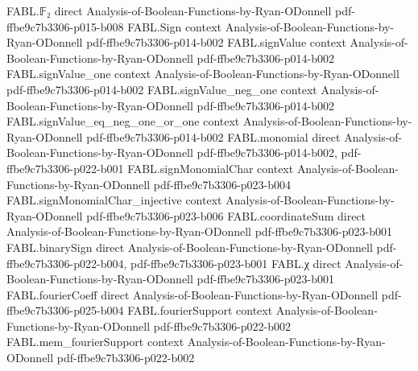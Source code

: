 \begin{theorem}
\label{FABL.measure_finiteFamilyCoefficient_bad_le}
\leanok
{}
\proofstep
  {FABL.𝔽₂}
  {direct}
  {Analysis-of-Boolean-Functions-by-Ryan-ODonnell}
  {pdf-ffbe9c7b3306-p015-b008}
\proofstep
  {FABL.Sign}
  {context}
  {Analysis-of-Boolean-Functions-by-Ryan-ODonnell}
  {pdf-ffbe9c7b3306-p014-b002}
\proofstep
  {FABL.signValue}
  {context}
  {Analysis-of-Boolean-Functions-by-Ryan-ODonnell}
  {pdf-ffbe9c7b3306-p014-b002}
\proofstep
  {FABL.signValue_one}
  {context}
  {Analysis-of-Boolean-Functions-by-Ryan-ODonnell}
  {pdf-ffbe9c7b3306-p014-b002}
\proofstep
  {FABL.signValue_neg_one}
  {context}
  {Analysis-of-Boolean-Functions-by-Ryan-ODonnell}
  {pdf-ffbe9c7b3306-p014-b002}
\proofstep
  {FABL.signValue_eq_neg_one_or_one}
  {context}
  {Analysis-of-Boolean-Functions-by-Ryan-ODonnell}
  {pdf-ffbe9c7b3306-p014-b002}
\proofstep
  {FABL.monomial}
  {direct}
  {Analysis-of-Boolean-Functions-by-Ryan-ODonnell}
  {pdf-ffbe9c7b3306-p014-b002,
    pdf-ffbe9c7b3306-p022-b001}
\proofstep
  {FABL.signMonomialChar}
  {context}
  {Analysis-of-Boolean-Functions-by-Ryan-ODonnell}
  {pdf-ffbe9c7b3306-p023-b004}
\proofstep
  {FABL.signMonomialChar_injective}
  {context}
  {Analysis-of-Boolean-Functions-by-Ryan-ODonnell}
  {pdf-ffbe9c7b3306-p023-b006}
\proofstep
  {FABL.coordinateSum}
  {direct}
  {Analysis-of-Boolean-Functions-by-Ryan-ODonnell}
  {pdf-ffbe9c7b3306-p023-b001}
\proofstep
  {FABL.binarySign}
  {direct}
  {Analysis-of-Boolean-Functions-by-Ryan-ODonnell}
  {pdf-ffbe9c7b3306-p022-b004,
    pdf-ffbe9c7b3306-p023-b001}
\proofstep
  {FABL.χ}
  {direct}
  {Analysis-of-Boolean-Functions-by-Ryan-ODonnell}
  {pdf-ffbe9c7b3306-p023-b001}
\proofstep
  {FABL.fourierCoeff}
  {direct}
  {Analysis-of-Boolean-Functions-by-Ryan-ODonnell}
  {pdf-ffbe9c7b3306-p025-b004}
\proofstep
  {FABL.fourierSupport}
  {context}
  {Analysis-of-Boolean-Functions-by-Ryan-ODonnell}
  {pdf-ffbe9c7b3306-p022-b002}
\proofstep
  {FABL.mem_fourierSupport}
  {context}
  {Analysis-of-Boolean-Functions-by-Ryan-ODonnell}
  {pdf-ffbe9c7b3306-p022-b002}

\end{theorem}
